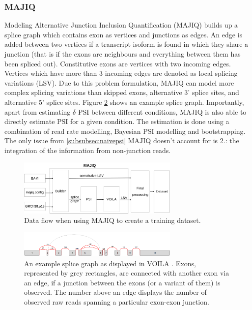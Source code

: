 \subsubsection{MAJIQ}\label{subsubsec:majiq}
Modeling Alternative Junction Inclusion Quantification (MAJIQ) builds up a splice graph \cite{majiq2} which contains exon as vertices and junctions as edges. An edge is added between two vertices if a transcript isoform is found in which they share a junction (that is if the exons are neighbours and everything between them has been spliced out).
Constitutive exons are vertices with two incoming edges.
Vertices which have more than 3 incoming edges are denoted as local splicing variations (LSV). Due to this problem formulation, MAJIQ can model more complex splicing variations than skipped exons, alternative 3' splice sites, and alternative 5' splice sites. Figure \ref{fig:splice_graph} shows an example splice graph. Importantly, apart from estimating $\delta$ PSI between different conditions, MAJIQ is also able to directly estimate PSI for a given condition. The estimation is done using a combination of read rate modelling, Bayesian PSI modelling and bootstrapping. The only issue from \ref{subsubsec:naivepsi} MAJIQ doesn't account for is 2.: the integration of the information from non-junction reads. 


\begin{figure}
	\centering\includegraphics[width=0.7\textwidth]{figures/d2v-majiq.pdf} 
	\caption{Data flow when using MAJIQ to create a training dataset. }
	\label{fig:majiq_dataset_creation_process}
\end{figure}

\begin{figure}
	\centering\includegraphics[width=0.7\textwidth]{../visualizations/ch4-methods/splice_graph.png} 
	\caption{An example splice graph as displayed in VOILA \cite{majiq2}. Exons, represented by grey rectangles, are connected with another exon via an edge, if a junction between the exons (or a variant of them) is observed. The number above an edge displays the number of observed raw reads spanning a particular exon-exon junction.}
	\label{fig:splice_graph}
\end{figure}

